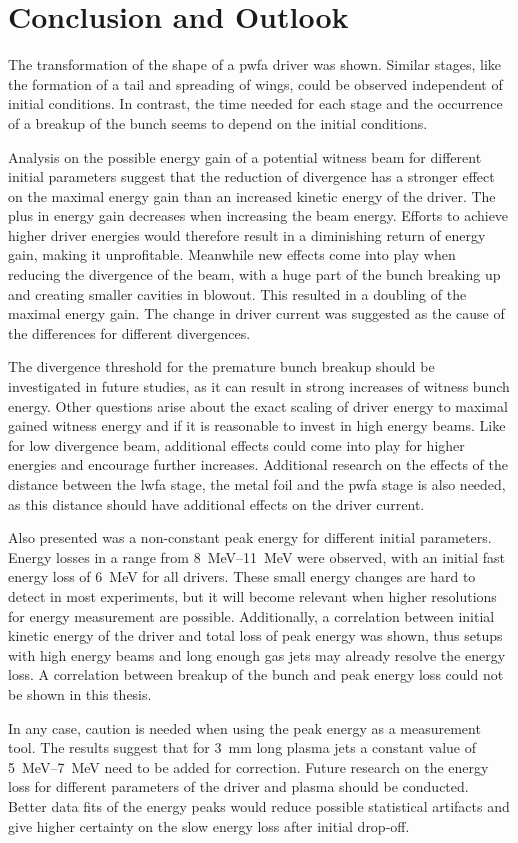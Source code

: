 \documentclass[bachelor_thesis]{subfiles}
\begin{document}
\chapter{Conclusion and Outlook} \label{chap:conclusion}
The transformation of the shape of a \gls{pwfa} driver was shown. Similar stages, like the formation of a tail and spreading of wings, could be observed independent of initial conditions. 
In contrast, the time needed for each stage and the occurrence of a breakup of the bunch seems to depend on the initial conditions.

Analysis on the possible energy gain of a potential witness beam for different initial parameters suggest that the reduction of divergence has a stronger effect on the maximal energy gain than an increased kinetic energy of the driver.
The plus in energy gain decreases when increasing the beam energy. Efforts to achieve higher driver energies would therefore result in a diminishing return of energy gain, making it unprofitable. 
Meanwhile new effects come into play when reducing the divergence of the beam, with a huge part of the bunch breaking up and creating smaller cavities in blowout. This resulted in a doubling of the maximal energy gain.
The change in driver current was suggested as the cause of the differences for different divergences.

The divergence threshold for the premature bunch breakup should be investigated in future studies, as it can result in strong increases of witness bunch energy.
Other questions arise about the exact scaling of driver energy to maximal gained witness energy and if it is reasonable to invest in high energy beams. Like for low divergence beam, additional effects could come into play for higher energies and encourage further increases.
Additional research on the effects of the distance between the \gls{lwfa} stage, the metal foil and the \gls{pwfa} stage is also needed, as this distance should have additional effects on the driver current.

Also presented was a non-constant peak energy for different initial parameters. Energy losses in a range from \qtyrange{8}{11}{\MeV} were observed, with an initial fast energy loss of \qty{6}{\MeV} for all drivers.
These small energy changes are hard to detect in most experiments, but it will become relevant when higher resolutions for energy measurement are possible. 
Additionally, a correlation between initial kinetic energy of the driver and total loss of peak energy was shown, thus setups with high energy beams and long enough gas jets may already resolve the energy loss.
A correlation between breakup of the bunch and peak energy loss could not be shown in this thesis.

In any case, caution is needed when using the peak energy as a measurement tool. The results suggest that for \qty{3}{\mm} long plasma jets a constant value of \qtyrange{5}{7}{\MeV} need to be added for correction.
Future research on the energy loss for different parameters of the driver and plasma should be conducted. Better data fits of the energy peaks would reduce possible statistical artifacts and give higher certainty on the slow energy loss after initial drop-off.
\end{document}
